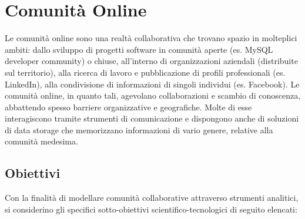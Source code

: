 \chapter{Comunit{\`a} Online}

Le comunit{\`a} online sono una realt{\`a} collaborativa che trovano spazio in molteplici ambiti: dallo sviluppo di progetti software in comunit{\`a} aperte (es. MySQL developer community) o chiuse, all'interno di organizzazioni aziendali (distribuite sul territorio), alla ricerca di lavoro e pubblicazione di profili professionali (es. LinkedIn), alla condivisione di informazioni di singoli individui (es. Facebook). Le comunit{\`a} online, in quanto tali, agevolano collaborazioni e scambio di conoscenza, abbattendo spesso barriere organizzative e geografiche. Molte di esse interagiscono tramite strumenti di comunicazione e dispongono anche di soluzioni di data storage che memorizzano informazioni di vario genere, relative alla comunit{\`a} medesima. 

\section{Obiettivi}
Con la finalit{\`a} di modellare comunit{\`a} collaborative attraverso strumenti analitici, si considerino gli specifici sotto-obiettivi scientifico-tecnologici di seguito elencati:

